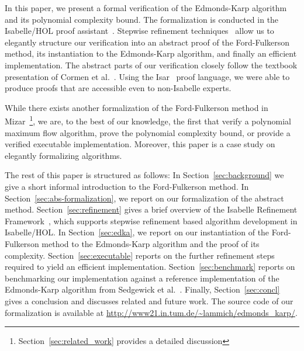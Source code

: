 \documentclass[smallcondensed]{svjour3}     %
\begin{document}
In this paper, we present a formal verification of the Edmonds-Karp algorithm and its polynomial complexity bound.
The formalization is conducted in the Isabelle/HOL proof assistant~\cite{NPW02}. 
Stepwise refinement techniques~\cite{Wirth71,Back78,BaWr98} allow us to elegantly structure our verification into an abstract proof of the Ford-Fulkerson method,
its instantiation to the Edmonds-Karp algorithm, and finally an efficient implementation. The abstract parts of our verification closely follow the textbook presentation of Cormen et al.~\cite{CLRS09}. Using the Isar~\cite{Wenzel99} proof language, we were able to produce proofs that are accessible even to non-Isabelle experts.

While there exists another formalization of the Ford-Fulkerson method in Mizar~\cite{Lee05}\footnote{Section~\ref{sec:related_work} provides a detailed discussion}, we are, to the best of our knowledge, the first that verify a polynomial maximum flow algorithm, prove the polynomial complexity bound, or provide a verified executable implementation. Moreover, this paper is a case study on elegantly formalizing algorithms.

The rest of this paper is structured as follows: In Section~\ref{sec:background} we give a short informal introduction to the Ford-Fulkerson method.
In Section~\ref{sec:abs-formalization}, we report on our formalization of the abstract method. 
Section~\ref{sec:refinement} gives a brief overview of the Isabelle Refinement Framework~\cite{LaTu12,La12}, which supports stepwise refinement based algorithm development in Isabelle/HOL. In Section~\ref{sec:edka}, we report on our instantiation of the Ford-Fulkerson method to the Edmonds-Karp algorithm and the proof of its complexity.
Section~\ref{sec:executable} reports on the further refinement steps required to yield an efficient implementation. Section~\ref{sec:benchmark} reports on 
benchmarking our implementation against a reference implementation of the Edmonds-Karp algorithm from Sedgewick et al.~\cite{SeWa11}. 
Finally, Section~\ref{sec:concl} gives a conclusion and discusses related and future work. The source code of our formalization is available at \url{http://www21.in.tum.de/~lammich/edmonds_karp/}.


\end{document}
